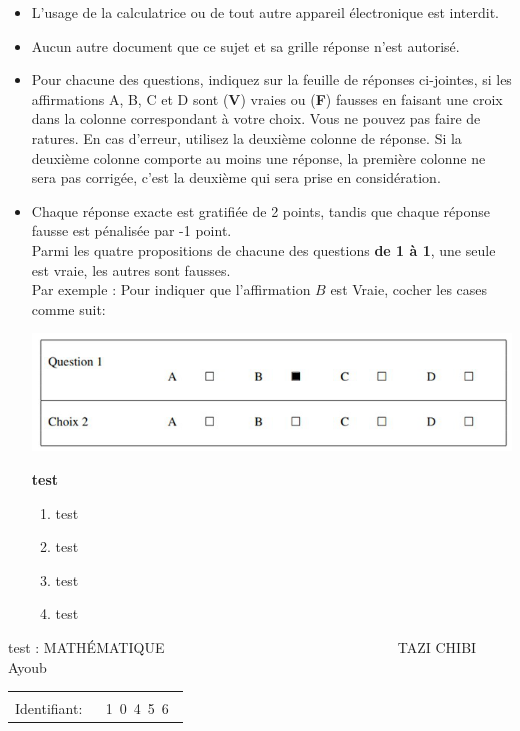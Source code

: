 \documentclass{book}%
\begin{document}
\begin{itemize}%
\item%
L'usage de la calculatrice ou de tout autre appareil électronique est interdit.%
\item%
Aucun autre document que ce sujet et sa grille réponse n'est autorisé.%
\item%
Pour chacune des questions, indiquez sur la feuille de réponses ci-jointes, si les affirmations A, B, C et D sont (\textbf{V}) vraies ou (\textbf{F}) fausses en faisant une croix dans la colonne correspondant à votre choix. Vous ne pouvez pas faire de ratures. En cas d'erreur, utilisez la deuxième colonne de réponse. Si la deuxième colonne comporte au moins une réponse, la première colonne ne sera pas corrigée, c'est la deuxième qui sera prise en considération.%
\item%
Chaque réponse exacte est gratifiée de 2 points, tandis que chaque réponse fausse est pénalisée par -1 point. \\ 	Parmi les quatre propositions de chacune des questions \textbf{de 1 à 1}, une seule est vraie, les autres sont fausses. \\ 	Par exemple : Pour indiquer que l'affirmation $B$ est Vraie, cocher les cases comme suit:  \\ \begin{center}	\includegraphics[scale=0.8]{reponses.png} \end{center}%
\thispagestyle{empty}%
\begin{exercise}%
\textbf{test }%
\begin{enumerate}[label=\textbf{\Alph*. }]%
\item%
test%
\item%
test%
\item%
test%
\item%
test%
\end{enumerate}%
\end{exercise}%
\end{itemize}%
\newpage%
\thispagestyle{empty}%
test : MATHÉMATIQUE $\qquad \qquad \qquad \qquad \qquad \qquad \qquad \qquad$ TAZI CHIBI Ayoub%
\begin{flushright}%
\begin{tabular}{|l|}%
\hline%
 \\%
\thispagestyle{empty}%
Identifiant: $\quad$ {\Large 1~0~4~5~6~}%
 \\%
\hline%
\end{tabular}%
\end{flushright}%
\end{document}
